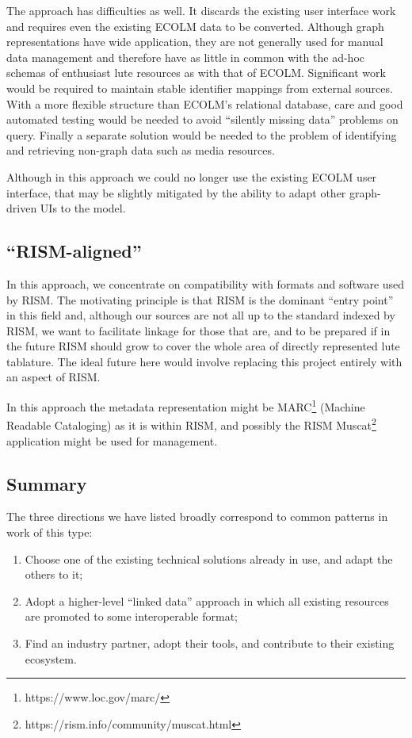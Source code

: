 \documentclass[sigconf, nonacm=true]{acmart}
\begin{document}
\begin{sloppypar}
  The approach has difficulties as well. It discards the existing user
  interface work and requires even the existing ECOLM data to be
  converted. Although graph representations have wide application,
  they are not generally used for manual data management and therefore
  have as little in common with the ad-hoc schemas of enthusiast lute
  resources as with that of ECOLM. Significant work would be required
  to maintain stable identifier mappings from external sources. With a
  more flexible structure than ECOLM's relational database, care and
  good automated testing would be needed to avoid ``silently missing
  data'' problems on query. Finally a separate solution would be
  needed to the problem of identifying and retrieving non-graph data
  such as media resources.

  Although in this approach we could no longer use the existing ECOLM
  user interface, that may be slightly mitigated by the ability to
  adapt other graph-driven UIs to the model.
  
  \subsection{``RISM-aligned''}

  In this approach, we concentrate on compatibility with formats and
  software used by RISM. The motivating principle is that RISM is the
  dominant ``entry point'' in this field and, although our sources are
  not all up to the standard indexed by RISM, we want to facilitate
  linkage for those that are, and to be prepared if in the future RISM
  should grow to cover the whole area of directly represented lute
  tablature. The ideal future here would involve replacing this
  project entirely with an aspect of RISM.

  In this approach the metadata representation might be
  MARC\footnote{https://www.loc.gov/marc/} (Machine Readable
  Cataloging) as it is within RISM, and possibly the RISM
  Muscat\footnote{https://rism.info/community/muscat.html} application
  might be used for management.

  \subsection{Summary}

  The three directions we have listed broadly correspond to common
  patterns in work of this type:

  \begin{enumerate}
  \item Choose one of the existing technical solutions already in use,
    and adapt the others to it;
  \item Adopt a higher-level ``linked data'' approach in which all
    existing resources are promoted to some interoperable format;
  \item Find an industry partner, adopt their tools, and contribute to
    their existing ecosystem.
  \end{enumerate}


\end{sloppypar}
\end{document}
